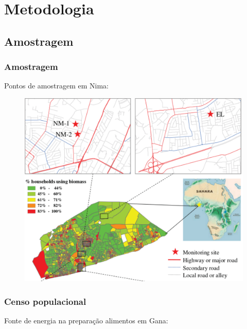 \section{Metodologia}

\subsection{Amostragem}
\begin{frame}
  \frametitle{Amostragem}
 \begin{center}
  Pontos de amostragem em Nima:
 \end{center}
  \begin{figure}[H]
    \centering
    \includegraphics[scale=0.35]{../../inputs/images/zheng/nima_mapa.pdf}
  \end{figure}
\end{frame}

\begin{frame}
  \frametitle{Censo populacional}
\begin{center}
  Fonte de energia na preparação alimentos em Gana:
\end{center}
  \begin{table}[H]
  	\centering
  	
  \end{table}
\end{frame}

